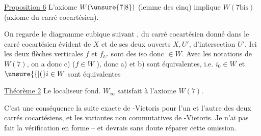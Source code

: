 \uline{Proposition 6} L'axiome $W(\unsure{7|8})$ (lemme des cinq)
implique $W(7\mathrm{bis})$ (axiome du carré cocartésien).

On regarde le diagramme cubique suivant
, du carré cocartésien donné dans le carré cocartésien
évident de $X$ et de ses deux ouverts $X,U'$,
d'intersection $U'$. Ici les deux flèches verticales
$f$ et $f_{U'}$ sont des iso donc  $\in W$. Avec les
notations de $W(7)$, on a donc c) ($f\in W$ \unsure{!}),
donc a) et b) sont équivalentes, i.e. $i_0\in W$
et $\unsure{\{|(}i\in W$ sont équivalentes \hfill {}

\uline{Théorème 2} Le localiseur fond. $W_{\infty}$ satisfait à
l'axiome $W(7)$.

C'est  une conséquence   la suite exacte
de -Vietoris pour l'un  et l'autre
des deux carrés cocartésiens, et les variantes
non commutatives de -Vietoris. Je n'ai
pas fait la vérification en forme -- et devrais
sans doute réparer cette omission.
